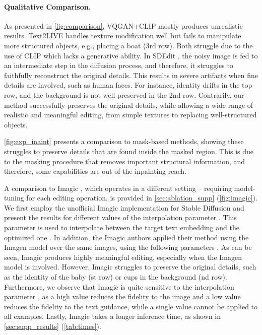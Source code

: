 \vspace{-0.3cm}
\paragraph{Qualitative Comparison.}
As presented in \cref{fig:comparison}, VQGAN+CLIP \cite{katherine2021vqganclip} mostly produces unrealistic results. Text2LIVE \cite{bar2022text2live} handles texture modification well but fails to manipulate more structured objects, e.g., placing a boat (3rd row). 
Both struggle due to the use of CLIP \cite{radford2021learning} which lacks a generative ability.
In SDEdit \cite{meng2021sdedit}, the noisy image is fed to an intermediate step in the diffusion process, and therefore, it struggles to faithfully reconstruct the original details. This results in severe artifacts when fine details are involved, such as human faces. For instance, identity drifts in the top row, and the background is not well preserved in the 2nd row.
Contrarily, our method successfully preserves the original details, while allowing a wide range of realistic and meaningful editing, from simple textures to replacing well-structured objects.



\cref{fig:exp_inaint} presents a comparison to mask-based methods, showing these struggles to preserve details that are found inside the masked region. This is due to the masking procedure that removes important structural information, and therefore, some capabilities are out of the inpainting reach.



A comparison to Imagic \cite{Kawar2022ImagicTR}, which operates in a different setting -- requiring model-tuning for each editing operation, is provided in \cref{sec:ablation_supp} (\cref{fig:imagic}). We first employ the unofficial Imagic implementation for Stable Diffusion and present the results for different values of the interpolation parameter . This parameter is used to interpolate between the target text embedding and the optimized one \cite{Kawar2022ImagicTR}. In addition, the Imagic authors applied their method using the Imagen model over the same images, using the following parameters .
As can be seen, Imagic produces highly meaningful editing, especially when the Imagen model is involved.
However, Imagic struggles to preserve the original details, such as the identity of the baby (st row) or cups in the background (nd row). Furthermore, we observe that Imagic is quite sensitive to the interpolation parameter , as a high value reduces the fidelity to the image and a low value reduces the fidelity to the text guidance, while a single value cannot be applied to all examples. Lastly, Imagic takes a longer inference time, as shown in \cref{sec:supp_results} (\cref{tab:times}).





